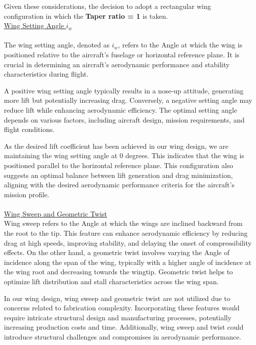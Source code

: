 \documentclass[12 pt]{article}
\begin{document}
{ Given these considerations, the decision to adopt a rectangular wing configuration in which the\textbf{ Taper ratio = 1 }is taken.\\

\color{red}
\large{\underline{Wing Setting Angle $i_w$}}\\
\\ \color{black}
The wing setting angle, denoted as \( i_w \), refers to the Angle at which the wing is positioned relative to the aircraft's fuselage or horizontal reference plane. It is crucial in determining an aircraft's aerodynamic performance and stability characteristics during flight.

A positive wing setting angle typically results in a nose-up attitude, generating more lift but potentially increasing drag. Conversely, a negative setting angle may reduce lift while enhancing aerodynamic efficiency. The optimal setting angle depends on various factors, including aircraft design, mission requirements, and flight conditions.

As the desired lift coefficient has been achieved in our wing design,  we are maintaining the wing setting angle at 0 degrees. This indicates that the wing is positioned parallel to the horizontal reference plane. This configuration also suggests an optimal balance between lift generation and drag minimization, aligning with the desired aerodynamic performance criteria for the aircraft's mission profile.\\
\\ \vspace{10mm}
\color{red}
\large{\underline{Wing Sweep and Geometric Twist}}\\
\color{black}
Wing sweep refers to the Angle at which the wings are inclined backward from the root to the tip. This feature can enhance aerodynamic efficiency by reducing drag at high speeds, improving stability, and delaying the onset of compressibility effects. On the other hand, a geometric twist involves varying the Angle of incidence along the span of the wing, typically with a higher angle of incidence at the wing root and decreasing towards the wingtip. Geometric twist helps to optimize lift distribution and stall characteristics across the wing span.

In our wing design, wing sweep and geometric twist are not utilized due to concerns related to fabrication complexity. Incorporating these features would require intricate structural design and manufacturing processes, potentially increasing production costs and time. Additionally, wing sweep and twist could introduce structural challenges and compromises in aerodynamic performance.

}
\end{document}
